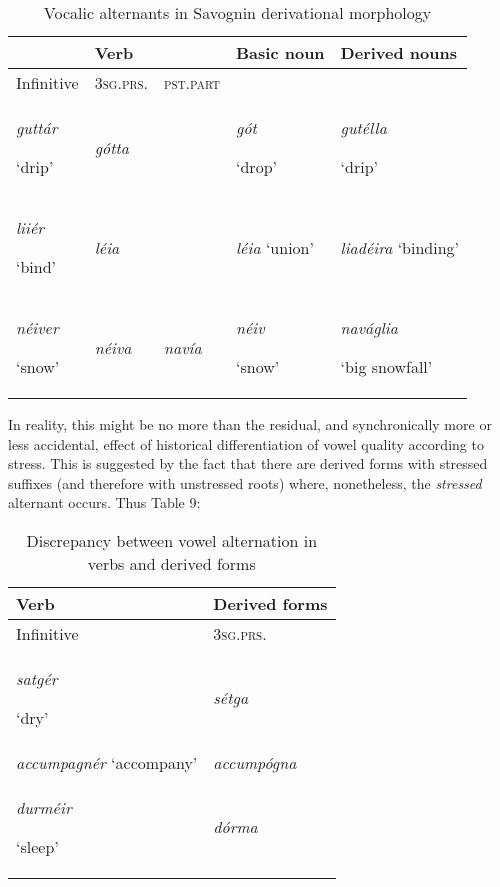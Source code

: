 \documentclass[output=paper,
modfonts
]{LSP/langsci}
\begin{document}
\begin{longtable}[]{@{}lllll@{}}
\caption{Vocalic alternants in Savognin derivational morphology}\\
\lsptoprule
& Verb & & Basic noun & Derived nouns\tabularnewline
\midrule
\endhead
Infinitive & \textsc{3sg.prs.} & \textsc{pst.part} & &\tabularnewline
\emph{guttár}

`drip' & \emph{gótta} & & \emph{gót}

`drop' & \emph{gutélla}

`drip'\tabularnewline
\emph{liiér}

`bind' & \emph{léia} & & \emph{léia} `union' & \emph{liadéira}
`binding'\tabularnewline
\emph{néiver}

`snow' & \emph{néiva} & \emph{navía } & \emph{néiv}

`snow' & \emph{naváglia}

`big snowfall'\tabularnewline
\bottomrule
\end{longtable}

In reality, this might be no more than the residual, and synchronically
more or less accidental, effect of historical differentiation of vowel
quality according to stress. This is suggested by the fact that there
are derived forms with stressed suffixes (and therefore with unstressed
roots) where, nonetheless, the \emph{stressed} alternant occurs. Thus
Table 9:


\begin{longtable}[]{@{}ll@{}}
\caption{Discrepancy between vowel alternation in verbs and derived forms} \\
\lsptoprule
Verb & Derived forms\tabularnewline
\midrule
\endhead
Infinitive & \textsc{3sg.prs.}\tabularnewline
\emph{satgér}

`dry' & \emph{sétga}\tabularnewline
\emph{accumpagnér} `accompany' & \emph{accumpógna}\tabularnewline
\emph{durméir }

`sleep' & \emph{dórma}\tabularnewline
\bottomrule
\end{longtable}
\end{document}
